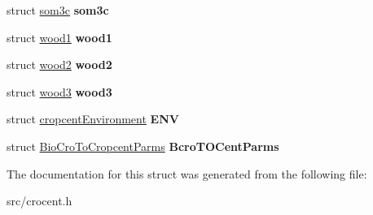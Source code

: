 \begin{DoxyCompactItemize}
\item 
\hypertarget{structcropcentlayer_aaad44a86153fc97f85f9276b9af9de6e}{struct \hyperlink{structsom3c}{som3c} {\bfseries som3c}}\label{structcropcentlayer_aaad44a86153fc97f85f9276b9af9de6e}

\item 
\hypertarget{structcropcentlayer_a485ec5dfa4c262bf583664e93993e11b}{struct \hyperlink{structwood1}{wood1} {\bfseries wood1}}\label{structcropcentlayer_a485ec5dfa4c262bf583664e93993e11b}

\item 
\hypertarget{structcropcentlayer_a1294098c53a42679a93667302c28c91f}{struct \hyperlink{structwood2}{wood2} {\bfseries wood2}}\label{structcropcentlayer_a1294098c53a42679a93667302c28c91f}

\item 
\hypertarget{structcropcentlayer_a89e6e9dddf5d0935cbe5ff53cfd8e802}{struct \hyperlink{structwood3}{wood3} {\bfseries wood3}}\label{structcropcentlayer_a89e6e9dddf5d0935cbe5ff53cfd8e802}

\item 
\hypertarget{structcropcentlayer_ac0df5cbf162c9608deaa323baafdeea8}{struct \hyperlink{structcropcent_environment}{cropcent\-Environment} {\bfseries E\-N\-V}}\label{structcropcentlayer_ac0df5cbf162c9608deaa323baafdeea8}

\item 
\hypertarget{structcropcentlayer_a7c9bcdc229131ab26f6289bad424a494}{struct \hyperlink{struct_bio_cro_to_cropcent_parms}{Bio\-Cro\-To\-Cropcent\-Parms} {\bfseries Bcro\-T\-O\-Cent\-Parms}}\label{structcropcentlayer_a7c9bcdc229131ab26f6289bad424a494}

\end{DoxyCompactItemize}


The documentation for this struct was generated from the following file\-:\begin{DoxyCompactItemize}
\item 
src/crocent.\-h\end{DoxyCompactItemize}

